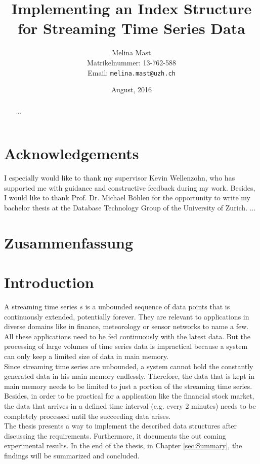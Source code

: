 \documentclass[abstracton,12pt]{scrreprt}
\title{Implementing an Index Structure for Streaming Time Series Data}
\author{
  Melina Mast\\[-5pt]
  \scriptsize Matrikelnummer: 13-762-588\\[-5pt]
  \scriptsize Email: \texttt{melina.mast@uzh.ch}
}
\date{\vspace*{2cm}August, 2016}
\begin{document}
\maketitle

\chapter*{Acknowledgements}

I especially would like to thank my supervisor Kevin Wellenzohn, who has supported me with guidance and constructive feedback during my work. Besides, I would like to thank Prof. Dr. Michael Böhlen for the opportunity to write my bachelor thesis at the Database Technology Group of the University of Zurich. ...   

\begin{abstract}
  ...
\end{abstract}

\chapter*{Zusammenfassung}

\tableofcontents
\listoffigures
\listoftables
\listofalgorithms


\chapter{Introduction}
A streaming time series \(s\) is a unbounded sequence of data points that is continuously extended, potentially forever. They are relevant to applications in diverse domains like in finance, meteorology or sensor networks to name a few. All these applications need to be fed continuously with the latest data. But the processing of large volumes of time series data is impractical because a system can only keep a limited size of data in main memory.\\
Since streaming time series are unbounded, a system cannot hold the constantly generated data in his main memory endlessly. Therefore, the data that is kept in main memory needs to be limited to just a portion of the streaming time series. Besides, in order to be practical for a application like the financial stock market, the data that arrives in a defined time interval (e.g. every 2 minutes) needs to be completely processed until the succeeding data arises.\\
The thesis presents a way to implement the described data structures after discussing the requirements. Furthermore, it documents the out coming experimental results.
In the end of the thesis, in Chapter \ref{sec:Summary}, the findings will be summarized and concluded.
\end{document}
